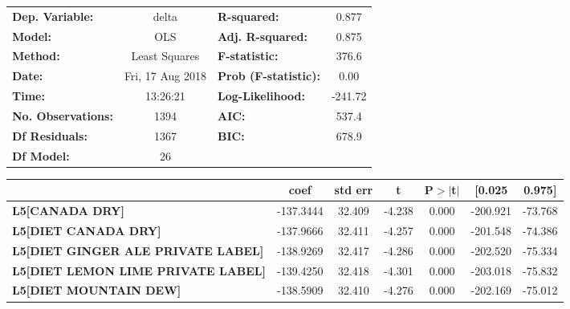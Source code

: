 \begin{center}
\begin{tabular}{lclc}
\toprule
\textbf{Dep. Variable:}                    &      delta       & \textbf{  R-squared:         } &     0.877   \\
\textbf{Model:}                            &       OLS        & \textbf{  Adj. R-squared:    } &     0.875   \\
\textbf{Method:}                           &  Least Squares   & \textbf{  F-statistic:       } &     376.6   \\
\textbf{Date:}                             & Fri, 17 Aug 2018 & \textbf{  Prob (F-statistic):} &     0.00    \\
\textbf{Time:}                             &     13:26:21     & \textbf{  Log-Likelihood:    } &   -241.72   \\
\textbf{No. Observations:}                 &        1394      & \textbf{  AIC:               } &     537.4   \\
\textbf{Df Residuals:}                     &        1367      & \textbf{  BIC:               } &     678.9   \\
\textbf{Df Model:}                         &          26      & \textbf{                     } &             \\
\bottomrule
\end{tabular}
\begin{tabular}{lcccccc}
                                           & \textbf{coef} & \textbf{std err} & \textbf{t} & \textbf{P$>$$|$t$|$} & \textbf{[0.025} & \textbf{0.975]}  \\
\midrule
\textbf{L5[CANADA DRY]}                    &    -137.3444  &       32.409     &    -4.238  &         0.000        &     -200.921    &      -73.768     \\
\textbf{L5[DIET CANADA DRY]}               &    -137.9666  &       32.411     &    -4.257  &         0.000        &     -201.548    &      -74.386     \\
\textbf{L5[DIET GINGER ALE PRIVATE LABEL]} &    -138.9269  &       32.417     &    -4.286  &         0.000        &     -202.520    &      -75.334     \\
\textbf{L5[DIET LEMON LIME PRIVATE LABEL]} &    -139.4250  &       32.418     &    -4.301  &         0.000        &     -203.018    &      -75.832     \\
\textbf{L5[DIET MOUNTAIN DEW]}             &    -138.5909  &       32.410     &    -4.276  &         0.000        &     -202.169    &      -75.012     \\

\end{tabular}
\end{center}
